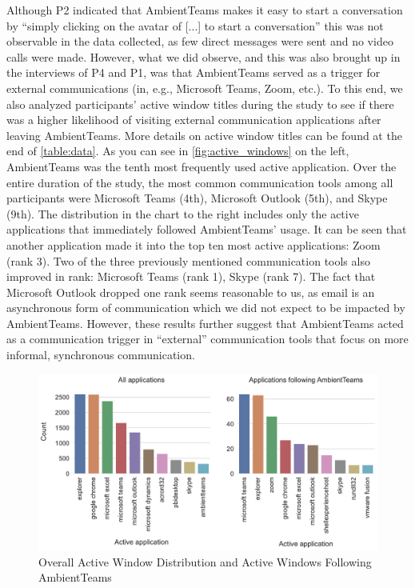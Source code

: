 Although P2 indicated that AmbientTeams makes it easy to start a conversation by \enquote{simply clicking on the avatar of [...] to start a conversation} this was not observable in the data collected, as few direct messages were sent and no video calls were made. However, what we did observe, and this was also brought up in the interviews of P4 and P1, was that AmbientTeams served as a trigger for external communications (in, e.g., Microsoft Teams, Zoom, etc.). To this end, we also analyzed participants' active window titles during the study to see if there was a higher likelihood of visiting external communication applications after leaving AmbientTeams. More details on active window titles can be found at the end of \autoref{table:data}. As you can see in \autoref{fig:active_windows} on the left, AmbientTeams was the tenth most frequently used active application. Over the entire duration of the study, the most common communication tools among all participants were Microsoft Teams (4th), Microsoft Outlook (5th), and Skype (9th). The distribution in the chart to the right includes only the active applications that immediately followed AmbientTeams' usage. It can be seen that another application made it into the top ten most active applications: Zoom (rank 3). Two of the three previously mentioned communication tools also improved in rank: Microsoft Teams (rank 1), Skype (rank 7). The fact that Microsoft Outlook dropped one rank seems reasonable to us, as email is an asynchronous form of communication which we did not expect to be impacted by AmbientTeams. However, these results further suggest that AmbientTeams acted as a communication trigger in \enquote{external} communication tools that focus on more informal, synchronous communication.

\begin{figure}[h]
    \centering
    \includegraphics[width=.7\linewidth]{plots/active_windows.pdf}
    \caption{Overall Active Window Distribution and Active Windows Following AmbientTeams}
    \label{fig:active_windows}
\end{figure}



